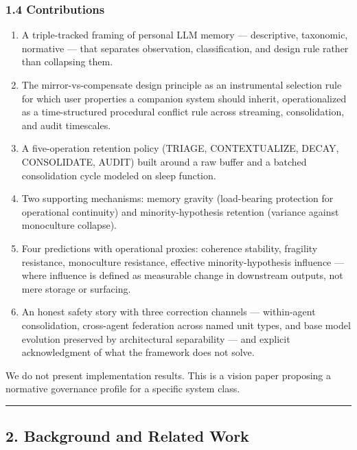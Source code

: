 \documentclass[
  11pt,
]{article}
\providecommand{\tightlist}{%
  \setlength{\itemsep}{0pt}\setlength{\parskip}{0pt}}
\begin{document}
\hypertarget{contributions}{%
\subsubsection{1.4 Contributions}\label{contributions}}

\begin{enumerate}
\def\labelenumi{\arabic{enumi}.}
\tightlist
\item
  A triple-tracked framing of personal LLM memory --- descriptive,
  taxonomic, normative --- that separates observation, classification,
  and design rule rather than collapsing them.
\item
  The mirror-vs-compensate design principle as an instrumental selection
  rule for which user properties a companion system should inherit,
  operationalized as a time-structured procedural conflict rule across
  streaming, consolidation, and audit timescales.
\item
  A five-operation retention policy (TRIAGE, CONTEXTUALIZE, DECAY,
  CONSOLIDATE, AUDIT) built around a raw buffer and a batched
  consolidation cycle modeled on sleep function.
\item
  Two supporting mechanisms: memory gravity (load-bearing protection for
  operational continuity) and minority-hypothesis retention (variance
  against monoculture collapse).
\item
  Four predictions with operational proxies: coherence stability,
  fragility resistance, monoculture resistance, effective
  minority-hypothesis influence --- where influence is defined as
  measurable change in downstream outputs, not mere storage or
  surfacing.
\item
  An honest safety story with three correction channels --- within-agent
  consolidation, cross-agent federation across named unit types, and
  base model evolution preserved by architectural separability --- and
  explicit acknowledgment of what the framework does not solve.
\end{enumerate}

We do not present implementation results. This is a vision paper
proposing a normative governance profile for a specific system class.

\begin{center}\rule{0.5\linewidth}{0.5pt}\end{center}

\hypertarget{background-and-related-work}{%
\subsection{2. Background and Related
Work}\label{background-and-related-work}}
\end{document}
